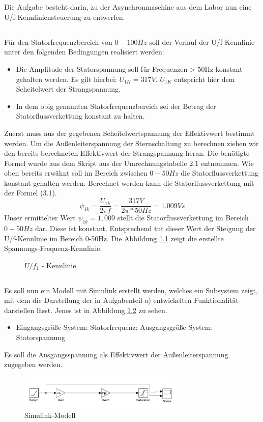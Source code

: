 \chapter{}
Die Aufgabe besteht darin, zu der Asynchronmaschine aus dem Labor nun eine U/f-Kennliniensteuerung zu entwerfen.
\section{}
Für den Statorfrequenzbereich von $ 0-100Hz $ soll der Verlauf der U/f-Kennlinie unter den folgenden Bedingungen realisiert werden:
\begin{itemize}
	\item Die Amplitude der Statorspannung soll für Frequenzen > 50Hz konstant gehalten werden. Es gilt hierbei: $ U_{1K} = 317V $. $ U_{1K} $ entspricht hier dem Scheitelwert der Strangspannung.
	\item In dem obig genannten Statorfrequenzbereich sei der Betrag der Statorflussverkettung konstant zu halten.
\end{itemize}

Zuerst muss aus der gegebenen Scheitelwertspannung der Effektivwert bestimmt werden. Um die Außenleiterspannung der Sternschaltung zu berechnen ziehen wir den bereits berechneten Effektivwert der Strangspannung heran. Die benötigte Formel wurde aus dem Skript aus der Umrechnungstabelle 2.1 entnommen. Wie oben bereits erwähnt soll im Bereich zwischen $ 0-50Hz $ die Statorflussverkettung konstant gehalten werden. Berechnet werden kann die Statorflussverkettung mit der Formel (3.1). 
\begin{equation}
	\psi_{1k} = \frac{U_{1k}}{2\pi f} = \frac{317V}{2\pi*50Hz} = 1.009Vs
\end{equation}
Unser ermittelter Wert $ \psi_{1k}=1,009 $ stellt die Statorflussverkettung im Bereich $ 0-50Hz $ dar. Diese ist konstant. Entsprechend tut dieser Wert der Steigung der U/f-Kennlinie im Bereich 0-50Hz. Die Abbildung \ref{fig:3:UF} zeigt die erstellte Spannungs-Frequenz-Kennlinie.

\begin{figure}[h]
	\centering
	
	\caption{$ U/f_{1} $ - Kennlinie}
	\label{fig:3:UF}
\end{figure}

\section{}
Es soll nun ein Modell mit Simulink erstellt werden, welches ein Subsystem zeigt, mit dem die Darstellung der in Aufgabenteil a) entwickelten Funktionalität darstellen lässt. Jenes ist in Abbildung \ref{fig:3:simulink} zu sehen.
\begin{itemize}
	\item Eingangsgröße System: Statorfrequenz; Ausgangsgröße System: Statorspannung
\end{itemize}
Es soll die Ausgangsspannung als Effektivwert der Außenleiterspannung zugegeben werden.

\begin{figure}[h]
	\centering
	\includegraphics[width=0.7\textwidth]{./Bilder/Simulink-Modell.pdf}
	\caption{Simulink-Modell}
	\label{fig:3:simulink}
\end{figure}